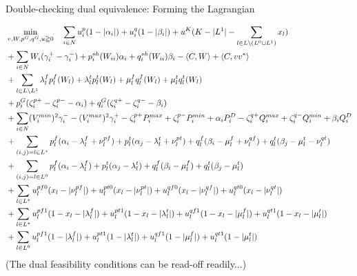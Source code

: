 \documentclass[xcolor=dvipsnames]{beamer}
\newcommand{\ii}{i}
\newcommand{\WW}{W}
\begin{document}
\begin{frame}{Double-checking dual equivalence: Forming the Lagrangian}
\begin{tiny}
\begin{subequations}
\begin{align}
&\min_{v,W,p^G,q^G,u \geqq 0} \quad 
  \sum_{i \in N} u_i^{p}(1-|\alpha_{\ii}|) +  u_i^{q}(1-|\beta_{\ii}|)   
+ u^K(K-|L^1|-\sum_{l \in L \backslash (L^0 \cup L^1)} x_l) \notag \\
  &+\sum_{\ii \in N} W_\ii(\gamma_{\ii}^+-\gamma_{\ii}^-) +p_\ii^{sh}(\WW_{ii})\alpha_\ii + q_\ii^{sh}(\WW_{ii})\beta_\ii - \langle C , \WW \rangle + \langle C, v v^* \rangle \notag\\
&+\sum_{l \in L \backslash L^1} \lambda_l^f p_l^f(\WW_l) + \lambda_l^t p_l^t(\WW_l) + \mu_l^f q_l^f(\WW_l) + \mu_l^t q_l^t(\WW_l) \notag\\
&+ p_\ii^G(\zeta_\ii^{p+}-\zeta_\ii^{p-} - \alpha_\ii) + q_\ii^G(\zeta_\ii^{q+}-\zeta_\ii^{q-} - \beta_\ii)\notag \\
  &+\sum_{\ii \in N}  (V_\ii^{min})^2 \gamma_\ii^- - (V_\ii^{max})^2 \gamma_\ii^+ 
- \zeta_\ii^{p+}P_\ii^{max} + \zeta_\ii^{p-}P_\ii^{min} + \alpha_\ii P_\ii^D 
- \zeta_\ii^{q+}Q_\ii^{max} + \zeta_\ii^{q-}Q_\ii^{min} + \beta_\ii Q_\ii^D \notag \\
  &+ \sum_{(i,j)=l \in L^* } p_{l}^{f}(\alpha_i-\lambda_l^f+\nu_l^{pf}) + p_{l}^{t}(\alpha_j-\lambda_l^t + \nu_l^{pt}) 
                 + q_{l}^{f}(\beta_i-\mu_l^f+\nu_l^{qf}) + q_{l}^{t}(\beta_j-\mu_l^t-\nu_l^{qt})  \notag \\
  &+ \sum_{(i,j)=l \in L^0 } p_{l}^{f}(\alpha_i-\lambda_l^f) + p_{l}^{t}(\alpha_j-\lambda_l^t ) 
                 + q_{l}^{f}(\beta_i-\mu_l^f) + q_{l}^{t}(\beta_j-\mu_l^t)  \notag \\
& + \sum_{l \in L^* } u_l^{pf0}(x_l-|\nu_l^{pf}|) + u_l^{pt0}(x_l-|\nu_l^{pt}|) + u_l^{qf0}(x_l-|\nu_l^{qf}|) + u_l^{qt0}(x_l - |\nu_l^{qt}|) \notag \\
& + \sum_{l \in L^* } u_l^{pf1}(1-x_l - |\lambda_l^f|) + u_l^{pt1}(1-x_l-|\lambda_l^t|) + u_l^{qf1}(1-x_l-|\mu_l^f|) + u_l^{qt1}(1-x_l-|\mu_l^t|) \notag\\
& + \sum_{l \in L^0 } u_l^{pf1}(1-|\lambda_l^f|) + u_l^{pt1}(1-|\lambda_l^t|) + u_l^{qf1}(1-|\mu_l^f|) + u_l^{qt1}(1-|\mu_l^t|) \notag
\end{align}
\end{subequations}
(The dual feasibility conditions can be read-off readily...)
\end{tiny}
\end{frame}
\end{document}

